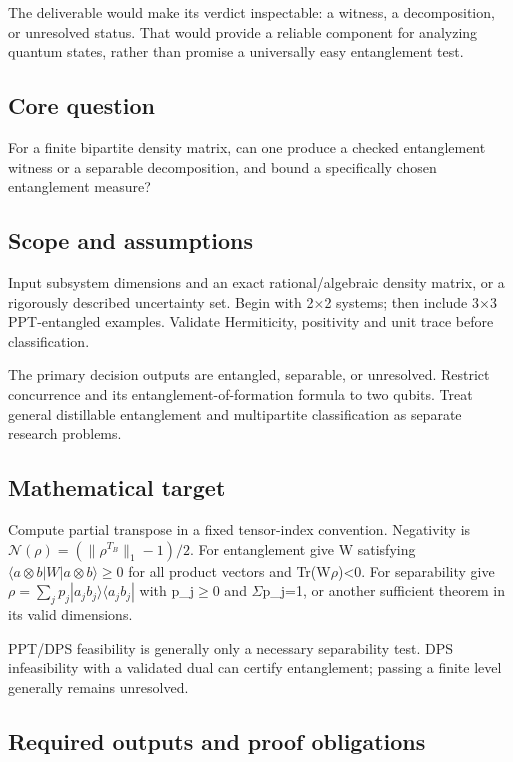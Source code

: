 \documentclass[
  11pt,
]{article}
\begin{document}
The deliverable would make its verdict inspectable: a witness, a
decomposition, or unresolved status. That would provide a reliable
component for analyzing quantum states, rather than promise a
universally easy entanglement test.

\subsection{Core question}

For a finite bipartite density matrix, can one produce a checked
entanglement witness or a separable decomposition, and bound a
specifically chosen entanglement measure?

\subsection{Scope and assumptions}

Input subsystem dimensions and an exact rational/algebraic density
matrix, or a rigorously described uncertainty set. Begin with
2\ensuremath{\times}2 systems; then include 3\ensuremath{\times}3
PPT-entangled examples. Validate Hermiticity, positivity and unit trace
before classification.

The primary decision outputs are entangled, separable, or unresolved.
Restrict concurrence and its entanglement-of-formation formula to two
qubits. Treat general distillable entanglement and multipartite
classification as separate research problems.

\subsection{Mathematical target}

Compute partial transpose in a fixed tensor-index convention. Negativity
is \(\mathcal N(\rho)=(\|\rho^{T_B}\|_1-1)/2\). For entanglement give W
satisfying \(\langle a\otimes b|W|a\otimes b\rangle\ge0\) for all
product vectors and Tr(W\ensuremath{\rho})<0. For separability give
\(\rho=\sum_jp_j|a_jb_j\rangle\langle a_jb_j|\) with
p\_j\ensuremath{\ge}0 and \ensuremath{\Sigma}p\_j=1, or another
sufficient theorem in its valid dimensions.

PPT/DPS feasibility is generally only a necessary separability test. DPS
infeasibility with a validated dual can certify entanglement; passing a
finite level generally remains unresolved.

\subsection{Required outputs and proof obligations}
\end{document}
